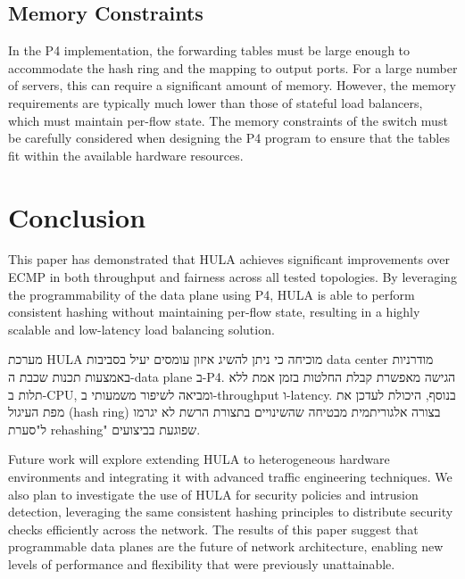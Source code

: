 \documentclass[12pt,a4paper]{article}
\begin{document}
\subsection{Memory Constraints}

In the P4 implementation, the forwarding tables must be large enough to accommodate the hash ring and the mapping to output ports. For a large number of servers, this can require a significant amount of memory. However, the memory requirements are typically much lower than those of stateful load balancers, which must maintain per-flow state. The memory constraints of the switch must be carefully considered when designing the P4 program to ensure that the tables fit within the available hardware resources.

\section{Conclusion}

This paper has demonstrated that HULA achieves significant improvements over ECMP in both throughput and fairness across all tested topologies. By leveraging the programmability of the data plane using P4, HULA is able to perform consistent hashing without maintaining per-flow state, resulting in a highly scalable and low-latency load balancing solution.

\begin{hebrew}
מערכת \textenglish{HULA} מוכיחה כי ניתן להשיג איזון עומסים יעיל בסביבות \textenglish{data center} מודרניות באמצעות תכנות שכבת ה-\textenglish{data plane} ב-\textenglish{P4.} הגישה מאפשרת קבלת החלטות בזמן אמת ללא תלות ב-\textenglish{CPU}, ומביאה לשיפור משמעותי ב-\textenglish{throughput} ו-\textenglish{latency.} בנוסף, היכולת לעדכן את מפת העיגול (\textenglish{hash ring}) בצורה אלגוריתמית מבטיחה שהשינויים בתצורת הרשת לא יגרמו ל"סערת \textenglish{rehashing}" שפוגעת בביצועים.
\end{hebrew}

Future work will explore extending HULA to heterogeneous hardware environments and integrating it with advanced traffic engineering techniques. We also plan to investigate the use of HULA for security policies and intrusion detection, leveraging the same consistent hashing principles to distribute security checks efficiently across the network. The results of this paper suggest that programmable data planes are the future of network architecture, enabling new levels of performance and flexibility that were previously unattainable.
\end{document}
